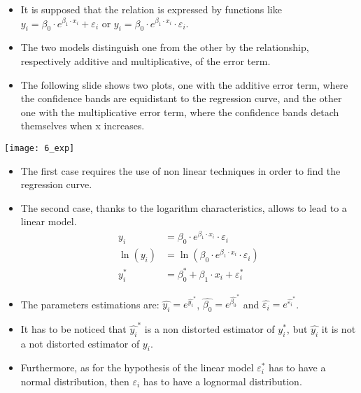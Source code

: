 \begin{frame}
  \vspace{0.25cm}
  \begin{itemize}
    \item It is supposed that the relation is expressed by functions like $ y_i = \beta_0 \cdot e^{\beta_1 \cdot x_i} + \varepsilon_i $ or $ y_i = \beta_0 \cdot e^{\beta_1 \cdot x_i} \cdot \varepsilon_i $.
    \vspace{0.25cm}
    \item The two models distinguish one from the other by the relationship, respectively additive and multiplicative, of the error term.
    \vspace{0.25cm}
    \item The following slide shows two plots, one with the additive error term, where the confidence bands are equidistant to the regression curve, and the other one with the multiplicative error term, where the confidence bands detach themselves when x increases.
  \end{itemize}
\end{frame}

\begin{frame}
  \begin{center}
    \texttt{[image: 6\_exp]}
  \end{center}
\end{frame}

\begin{frame}
  \begin{itemize}
    \item The first case requires the use of non linear techniques in order to find the regression curve.
    \item The second case, thanks to the logarithm characteristics, allows to lead to a linear model.
    \vspace{-0.5cm}
    \begin{displaymath}
      \begin{split}
        y_i &= \beta_0 \cdot e^{\beta_1 \cdot x_i} \cdot \varepsilon_i \\
        \ln(y_i) &= \ln(\beta_0 \cdot e^{\beta_1 \cdot x_i} \cdot \varepsilon_i) \\
        y_i^* &= \beta_0^* + \beta_1 \cdot x_i + \varepsilon_i^*
      \end{split}
    \end{displaymath}
    \item The parameters estimations are: $ \hat{y_i} = e^{\hat{y_i}^*} $, $ \hat{\beta_0} = e^{\hat{\beta_0}^*} $ and $ \hat{\varepsilon_i} = e^{\hat{\varepsilon_i}^*} $.
    \item It has to be noticed that $ \hat{y_i}^* $ is a non distorted estimator of $ y_i^* $, but $ \hat{y_i} $ it is not a not distorted estimator of $ y_i $.
    \item Furthermore, as for the hypothesis of the linear model $ \varepsilon_i^* $ has to have a normal distribution, then $ \varepsilon_i $ has to have a lognormal distribution.
  \end{itemize}
\end{frame}

